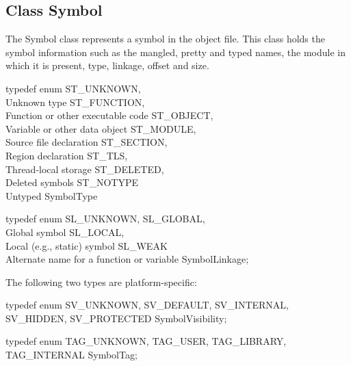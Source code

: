 \subsection{Class Symbol}

The Symbol class represents a symbol in the object file. This class holds the symbol information such as the mangled, pretty and typed names, the module in which it is present, type, linkage, offset and size.

\begin{apient}
typedef enum {
    ST_UNKNOWN,		\\ Unknown type
    ST_FUNCTION,	\\ Function or other executable code
    ST_OBJECT,		\\ Variable or other data object
    ST_MODULE,		\\ Source file declaration
    ST_SECTION,		\\ Region declaration
    ST_TLS,			\\ Thread-local storage
    ST_DELETED,		\\ Deleted symbols
    ST_NOTYPE		\\ Untyped
} SymbolType
\end{apient}

\begin{apient}
typedef enum {
    SL_UNKNOWN,
    SL_GLOBAL,		\\ Global symbol
    SL_LOCAL,		\\ Local (e.g., static) symbol
    SL_WEAK			\\ Alternate name for a function or variable
} SymbolLinkage;
\end{apient}

The following two types are platform-specific:

\begin{apient}
typedef enum {
    SV_UNKNOWN,
    SV_DEFAULT,
    SV_INTERNAL,
    SV_HIDDEN,
    SV_PROTECTED
} SymbolVisibility;
\end{apient}

\begin{apient}
typedef enum {
    TAG_UNKNOWN,
    TAG_USER,
    TAG_LIBRARY,
    TAG_INTERNAL
} SymbolTag; 
\end{apient}

